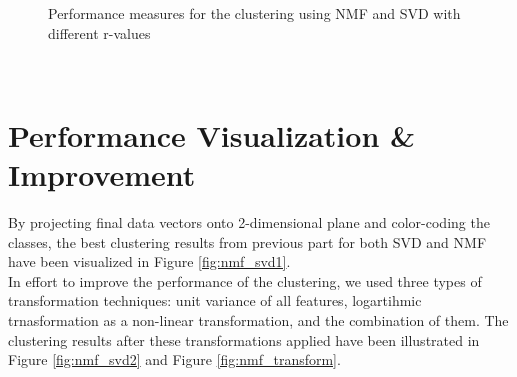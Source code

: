 \documentclass{article}
\begin{document}
\begin{figure}[!ht]
		\qquad
		\vspace*{-3mm}
	\caption{Performance measures for the clustering using NMF and SVD with different r-values}
	\label{fig:performance_measures}
\end{figure}

\\ 


\section{Performance Visualization \& Improvement}

By projecting final data vectors onto 2-dimensional plane and color-coding the classes, the best clustering results from previous part for both SVD and NMF have been visualized in Figure \ref{fig:nmf_svd1}. \\
In effort to improve the performance of the clustering, we used three types of transformation techniques: unit variance of all features, logartihmic trnasformation as a non-linear transformation, and the combination of them. The clustering results after these transformations applied have been illustrated in Figure \ref{fig:nmf_svd2} and Figure \ref{fig:nmf_transform}.  
\end{document}
